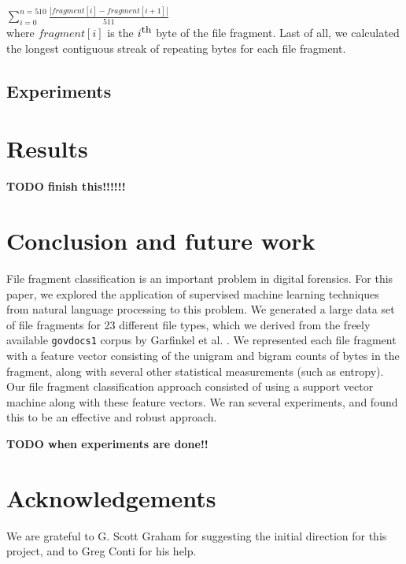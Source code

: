 \documentclass[letter,11pt]{article}
\begin{document}
$\sum_{i=0}^{n=510}\frac{|fragment[i] - fragment[i+1]|}{511}$ \\

{\noindent}where $fragment[i]$ is the $i^\textrm{\small th}$ byte of the file fragment. Last of all, we calculated the longest contiguous streak of repeating bytes for each file fragment.

\subsection{Experiments}
\label{Subsection:Experiments}

  








\section{Results}
\label{Section:Results}
\textbf{TODO finish this!!!!!!}

\section{Conclusion and future work}
\label{Section:ConclusionAndFutureWork}
File fragment classification is an important problem in digital forensics. For this paper, we explored the application of supervised machine learning techniques from natural language processing to this problem. We generated a large data set of file fragments for 23 different file types, which we derived from the freely available \texttt{govdocs1} corpus by Garfinkel et al. \cite{Garfinkel09}. We represented each file fragment with a feature vector consisting of the unigram and bigram counts of bytes in the fragment, along with several other statistical measurements (such as entropy). Our file fragment classification approach consisted of using a support vector machine along with these feature vectors. We ran several experiments, and found this to be an effective and robust approach.

\textbf{TODO when experiments are done!!}

\section*{Acknowledgements}
We are grateful to G. Scott Graham for suggesting the initial direction for this project, and to Greg Conti for his help.


\newpage


\end{document}
